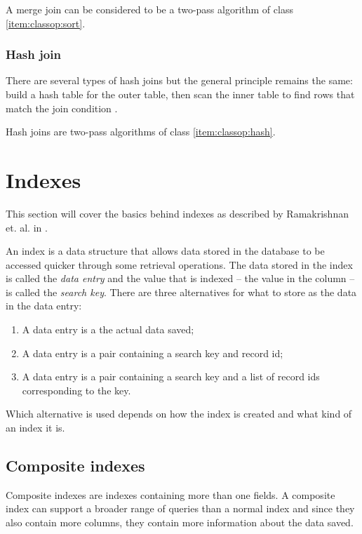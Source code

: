 A merge join can be considered to be a two-pass algorithm of class \ref{item:classop:sort}.

\subsubsection{Hash join}
There are several types of hash joins but the general principle remains the same: build a hash table for the outer table, then scan the inner table to find rows that match the join condition \cite[p. 732-738]{garcia-molina_2002_database_dstcb}.

Hash joins are two-pass algorithms of class \ref{item:classop:hash}.

\section{Indexes}
This section will cover the basics behind indexes as described by Ramakrishnan et. al. in \cite[Ch. 8]{ramakrishnan_2003_database_dms}.

An index is a data structure that allows data stored in the database to be accessed quicker through some retrieval operations. The data stored in the index is called the \textit{data entry} and the value that is indexed – the value in the column – is called the \textit{search key}. There are three alternatives for what to store as the data in the data entry:

\begin{enumerate}
    \item\label{item:indexes:alt1} A data entry is a the actual data saved;
    \item\label{item:indexes:alt2} A data entry is a pair containing a search key and record id;
    \item\label{item:indexes:alt3} A data entry is a pair containing a search key and a list of record ids corresponding to the key.
\end{enumerate}

Which alternative is used depends on how the index is created and what kind of an index it is.

\subsection{Composite indexes}
Composite indexes are indexes containing more than one fields. A composite index can support a broader range of queries than a normal index and since they also contain more columns, they contain more information about the data saved.

